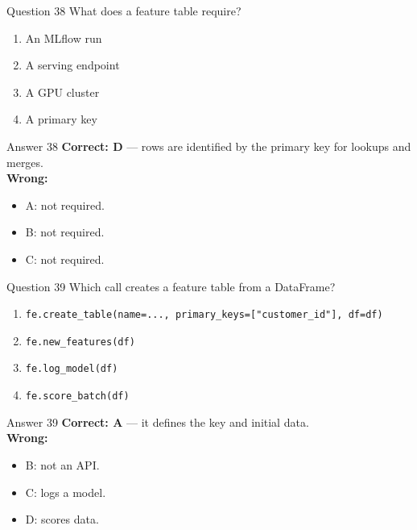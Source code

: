 \documentclass[aspectratio=169,11pt]{beamer}
\begin{document}
	\begin{frame}{Question 38}
		What does a feature table require?
		\begin{enumerate}[label=\Alph*.]
			\item An MLflow run
			\item A serving endpoint
			\item A GPU cluster
			\item A primary key
		\end{enumerate}
	\end{frame}
	\begin{frame}{Answer 38}
		\textbf{Correct: D} --- rows are identified by the primary key for lookups and merges.\\
		\vspace{0.5em}
		\textbf{Wrong:}
		\begin{itemize}
			\item A: not required.
			\item B: not required.
			\item C: not required.
		\end{itemize}
	\end{frame}
	
	\begin{frame}{Question 39}
		Which call creates a feature table from a DataFrame?
		\begin{enumerate}[label=\Alph*.]
			\item \texttt{fe.create\_table(name=..., primary\_keys=["customer\_id"], df=df)}
			\item \texttt{fe.new\_features(df)}
			\item \texttt{fe.log\_model(df)}
			\item \texttt{fe.score\_batch(df)}
		\end{enumerate}
	\end{frame}
	\begin{frame}{Answer 39}
		\textbf{Correct: A} --- it defines the key and initial data.\\
		\vspace{0.5em}
		\textbf{Wrong:}
		\begin{itemize}
			\item B: not an API.
			\item C: logs a model.
			\item D: scores data.
		\end{itemize}
	\end{frame}
	
\end{document}

